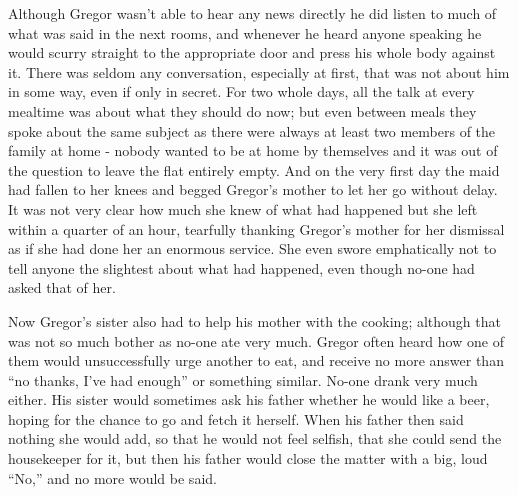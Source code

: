 \documentclass[12pt]{report}
\begin{document}
Although Gregor wasn't able to hear any news directly he did listen to
much of what was said in the next rooms, and whenever he heard anyone
speaking he would scurry straight to the appropriate door and press his
whole body against it. There was seldom any conversation, especially at
first, that was not about him in some way, even if only in secret. For
two whole days, all the talk at every mealtime was about what they
should do now; but even between meals they spoke about the same subject
as there were always at least two members of the family at home - nobody
wanted to be at home by themselves and it was out of the question to
leave the flat entirely empty. And on the very first day the maid had
fallen to her knees and begged Gregor's mother to let her go without
delay. It was not very clear how much she knew of what had happened but
she left within a quarter of an hour, tearfully thanking Gregor's mother
for her dismissal as if she had done her an enormous service. She even
swore emphatically not to tell anyone the slightest about what had
happened, even though no-one had asked that of her.

Now Gregor's sister also had to help his mother with the cooking;
although that was not so much bother as no-one ate very much. Gregor
often heard how one of them would unsuccessfully urge another to eat,
and receive no more answer than ``no thanks, I've had enough'' or
something similar. No-one drank very much either. His sister would
sometimes ask his father whether he would like a beer, hoping for the
chance to go and fetch it herself. When his father then said nothing she
would add, so that he would not feel selfish, that she could send the
housekeeper for it, but then his father would close the matter with a
big, loud ``No,'' and no more would be said.
\end{document}
